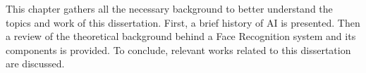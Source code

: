 \documentclass[class=report, crop=false, a4paper, 12pt]{standalone}
\begin{document}
This chapter gathers all the necessary background to better understand the topics and work of this dissertation. First, a brief history of \gls{AI} is presented. Then a review of the theoretical background behind a Face Recognition system and its components is provided. To conclude, relevant works related to this dissertation are discussed.


%
\end{document}
